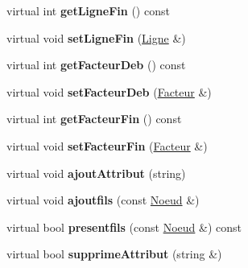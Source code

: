 \begin{DoxyCompactItemize}
\item 
\hypertarget{class_noeud_aab6e8f8deacca928d2eb1750473371e2}{virtual int {\bfseries get\-Ligne\-Fin} () const }\label{class_noeud_aab6e8f8deacca928d2eb1750473371e2}

\item 
\hypertarget{class_noeud_ab6a13086450c40dd3c3cf97623e221b3}{virtual void {\bfseries set\-Ligne\-Fin} (\hyperlink{class_ligne}{Ligne} \&)}\label{class_noeud_ab6a13086450c40dd3c3cf97623e221b3}

\item 
\hypertarget{class_noeud_a1d1aa4242f85ec3d08c95356d12f3402}{virtual int {\bfseries get\-Facteur\-Deb} () const }\label{class_noeud_a1d1aa4242f85ec3d08c95356d12f3402}

\item 
\hypertarget{class_noeud_a151533b22d7cd256fe4fe82bd91a9cfc}{virtual void {\bfseries set\-Facteur\-Deb} (\hyperlink{class_facteur}{Facteur} \&)}\label{class_noeud_a151533b22d7cd256fe4fe82bd91a9cfc}

\item 
\hypertarget{class_noeud_adfbbf10d9e0d33fb428d1bbaa6ede8e8}{virtual int {\bfseries get\-Facteur\-Fin} () const }\label{class_noeud_adfbbf10d9e0d33fb428d1bbaa6ede8e8}

\item 
\hypertarget{class_noeud_a54e787d47be1ae8fccbe5bd17d308180}{virtual void {\bfseries set\-Facteur\-Fin} (\hyperlink{class_facteur}{Facteur} \&)}\label{class_noeud_a54e787d47be1ae8fccbe5bd17d308180}

\item 
\hypertarget{class_noeud_acf7f0a209baf5a30c3661facc160ba6a}{virtual void {\bfseries ajout\-Attribut} (string)}\label{class_noeud_acf7f0a209baf5a30c3661facc160ba6a}

\item 
\hypertarget{class_noeud_a34182dcdc815394c81dee110de8884c9}{virtual void {\bfseries ajoutfils} (const \hyperlink{class_noeud}{Noeud} \&)}\label{class_noeud_a34182dcdc815394c81dee110de8884c9}

\item 
\hypertarget{class_noeud_a04519b75d0718f028532ae2286114f7b}{virtual bool {\bfseries presentfils} (const \hyperlink{class_noeud}{Noeud} \&) const }\label{class_noeud_a04519b75d0718f028532ae2286114f7b}

\item 
\hypertarget{class_noeud_a449e9a566a12cb8164963b3790fbad0a}{virtual bool {\bfseries supprime\-Attribut} (string \&)}\label{class_noeud_a449e9a566a12cb8164963b3790fbad0a}


\end{DoxyCompactItemize}
